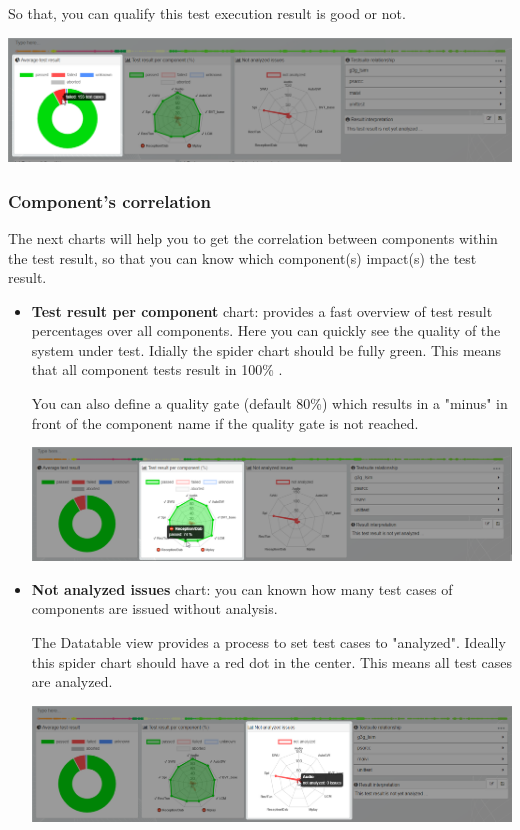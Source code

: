 So that, you can qualify this test execution result is good or not.

\includegraphics[width=1\linewidth]
{./pictures/dashboard/chart_average_test_result.png}

\subsubsection{Component's correlation}
The next charts will help you to get the correlation between components within
the test result, so that you can know which component(s) impact(s) the test
result.

\begin{itemize}
\item \textbf{Test result per component} chart: provides a fast overview of 
test result percentages over all components. Here you can quickly see
the quality of the system under test. Idially the spider chart should
be fully green. This means that all component tests result in 100\% .

You can also define a quality gate (default 80\%) which results in a "minus"
in front of the component name if the quality gate is not reached.


\includegraphics[width=1\linewidth]
{./pictures/dashboard/chart_test_result_per_component.png}


\item \textbf{Not analyzed issues} chart: you can known how many test cases of 
components are issued without analysis. 

The Datatable view provides a process to set  test cases to
"analyzed". Ideally this spider chart should have a red dot in the center.
This means all  test cases are analyzed.

\includegraphics[width=1\linewidth]
{./pictures/dashboard/chart_not_analyzed_issues.png}
\end{itemize}

